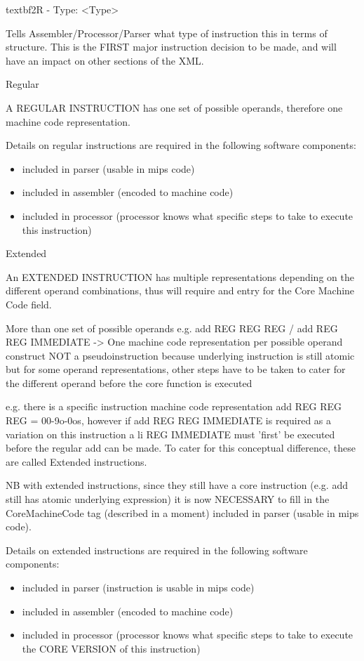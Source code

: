 \documentclass[12pt]{report}
\begin{document}
textbf{2R - Type: <Type> }

Tells Assembler/Processor/Parser what type of instruction this in terms of structure. This is the FIRST major instruction decision to be made, and will have an impact on other sections of the XML.

\begin{list}{Admissable Instruction Types}{}

\item[Regular]

A REGULAR INSTRUCTION has one set of possible operands, therefore one machine code representation.

Details on regular instructions are required in the following software components:
\begin{itemize}
\item included in parser (usable in mips code)
\item included in assembler (encoded to machine code)
\item included in processor (processor knows what specific steps to take to execute this instruction)
\end{itemize}

\item[Extended]

An EXTENDED INSTRUCTION has multiple representations depending on the different operand combinations, thus will require and entry for the Core Machine Code field.

More than one set of possible operands e.g. add REG REG REG / add REG REG IMMEDIATE -> One machine code representation per possible operand construct NOT a pseudoinstruction because underlying instruction is still atomic but for some operand representations, other steps have to be taken to cater for the different operand before the core function is executed

e.g. there is a specific instruction machine code representation add REG REG REG = 00-9o-0os, however if add REG REG IMMEDIATE is required as a variation on this instruction a li REG IMMEDIATE must 'first' be executed before the regular add can be made. To cater for this	conceptual difference, these are called Extended instructions.

NB with extended instructions, since they still have a core instruction (e.g. add still has atomic underlying expression) it is now NECESSARY to fill in the CoreMachineCode tag (described in a moment) included in parser (usable in mips code).

Details on extended instructions are required in the following software components:
\begin{itemize}
\item included in parser (instruction is usable in mips code)
\item included in assembler (encoded to machine code)
\item included in processor (processor knows what specific steps to take to execute the CORE VERSION of this instruction)
\end{itemize}


\end{list}
\end{document}
